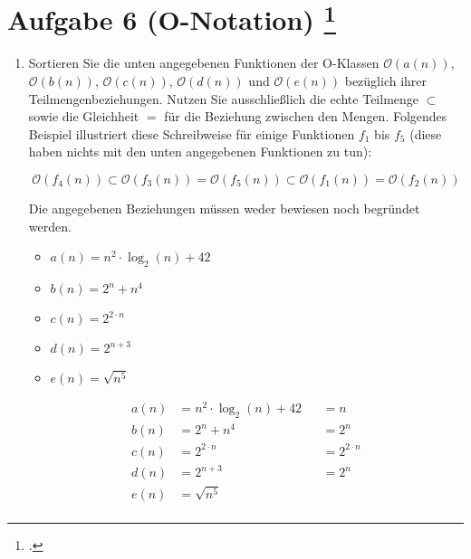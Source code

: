 \documentclass{bschlangaul-aufgabe}
\begin{document}
\section{Aufgabe 6 (O-Notation)
\footcite{examen:66115:2019:09}}

\begin{enumerate}


\item Sortieren Sie die unten angegebenen Funktionen der O-Klassen
$\mathcal{O}(a(n))$, $\mathcal{O}(b(n))$, $\mathcal{O}(c(n))$,
$\mathcal{O}(d(n))$ und $\mathcal{O}(e(n))$ bezüglich ihrer
Teilmengenbeziehungen. Nutzen Sie ausschließlich die echte Teilmenge
$\subset$ sowie die Gleichheit $=$ für die Beziehung zwischen den
Mengen. Folgendes Beispiel illustriert diese Schreibweise für einige
Funktionen $f_1$ bis $f_5$ (diese haben nichts mit den unten angegebenen
Funktionen zu tun):

\begin{displaymath}
\mathcal{O}(f_4 (n)) \subset \mathcal{O}(f_3(n)) = \mathcal{O}(f_5(n)) \subset \mathcal{O}(f_1(n)) = \mathcal{O}(f_2(n))
\end{displaymath}

Die angegebenen Beziehungen müssen weder bewiesen noch begründet werden.

\begin{itemize}
\item $a(n) = n^2 \cdot \log_2(n) + 42$
\item $b(n) = 2^n + n^4$
\item $c(n) = 2^{2 \cdot n}$
\item $d(n) = 2^{n+3}$
\item $e(n) = \sqrt{n^5}$
\end{itemize}

\begin{liAntwort}
\begin{align*}
a(n) &= n^2 \cdot \log_2(n) + 42 &&= n\\
b(n) &= 2^n + n^4 &&= 2^n\\
c(n) &= 2^{2 \cdot n} &&=2^{2 \cdot n}\\
d(n) &= 2^{n+3} &&= 2^n\\
e(n) &= \sqrt{n^5}\\
\end{align*}


\end{liAntwort}
\end{enumerate}
\end{document}
